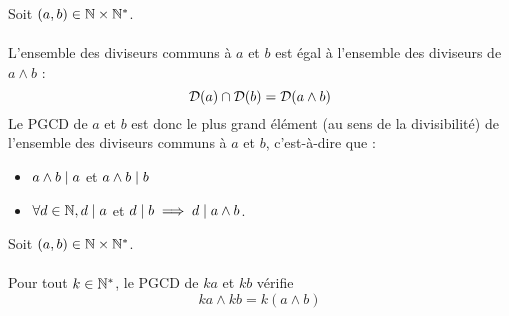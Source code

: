 \begin{defprop}
	Soit \((a, b) \in \mathbb{N} \times \mathbb{N}^*\).\\~\\
	L’ensemble des diviseurs communs à \(a\) et \(b\) est égal à l’ensemble des diviseurs de \(a \wedge b\) :
	\[\mathcal{D}(a) \cap \mathcal{D}(b) = \mathcal{D}(a \wedge b)\]
	Le PGCD de \(a\) et \(b\) est donc le plus grand élément (au sens de la divisibilité) de l’ensemble des diviseurs communs à \(a\) et \(b\), c’est-à-dire que :
	\begin{itemize}
		\item \(a \wedge b \mid a\) et \(a \wedge b \mid b\)
		      \item\( \forall d \in \mathbb{N}, d \mid a\) et \( d \mid b \implies d \mid a \wedge b\).
	\end{itemize}
\end{defprop}

\begin{defprop} 
	Soit \((a, b) \in \mathbb{N} \times \mathbb{N}^*\).\\~\\
	Pour tout \(k \in \mathbb{N}^*\), le PGCD de \(ka\) et \(kb\) vérifie
	\[ka \wedge kb = k (a \wedge b)\]
\end{defprop}

